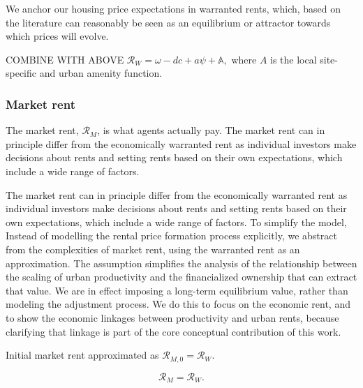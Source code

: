  We anchor our housing price expectations in warranted rents, which, based on the literature can reasonably be seen as an equilibrium or attractor towards which prices will evolve. 

COMBINE WITH ABOVE 
$\mathcal{R}_W = \omega - dc + a\psi + \mathbb{A},$
where $A$ is the local site-specific and urban amenity function. 

 
\subsubsection{Market rent} \label{section-market-rent}
The \gls{market rent}, $\mathcal{R}_M$, is what agents actually pay. The market rent can in principle differ from the economically warranted rent as individual investors make decisions about rents and setting rents based on their own expectations, which include a wide range of factors. 

The market rent can in principle differ from the economically warranted rent as individual investors make decisions about rents and setting rents based on their own expectations, which include a wide range of factors. To simplify the model, %
Instead of modelling the rental price formation process explicitly, we abstract from the complexities  of market rent, using the warranted rent as an approximation. The assumption simplifies the analysis of the relationship between the scaling of urban productivity and the financialized ownership that can extract that value. We are in effect imposing a long-term equilibrium value, rather than modeling the adjustment process. We do this to focus on the economic rent, and to show the economic linkages between productivity and urban rents, because clarifying that linkage is part of the core conceptual contribution of this work. 

Initial market rent approximated as %
$\mathcal{R}_{M, 0}= \mathcal{R}_W$.

\[\mathcal{R}_M = \mathcal{R}_W.\] 

